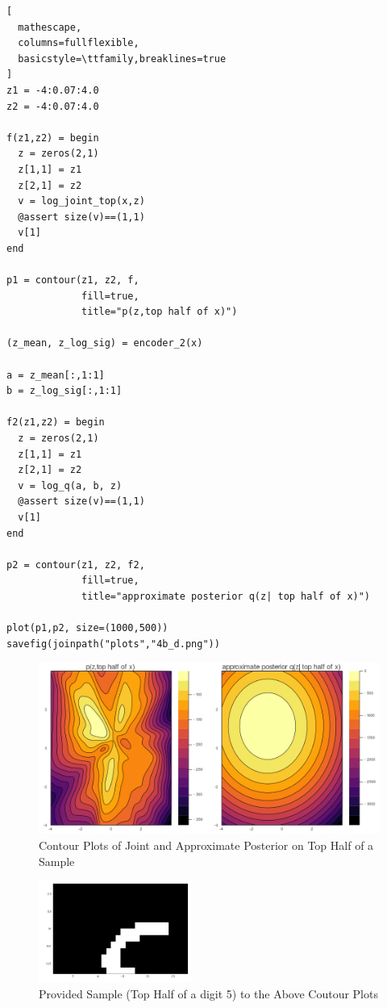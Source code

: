 \documentclass{article}
\begin{document}
\begin{enumerate}[label=(\alph*)]
\begin{lstlisting}[
  mathescape,
  columns=fullflexible,
  basicstyle=\ttfamily,breaklines=true
]
z1 = -4:0.07:4.0
z2 = -4:0.07:4.0

f(z1,z2) = begin
  z = zeros(2,1)
  z[1,1] = z1
  z[2,1] = z2
  v = log_joint_top(x,z)
  @assert size(v)==(1,1)
  v[1]
end

p1 = contour(z1, z2, f,
             fill=true,
             title="p(z,top half of x)")

(z_mean, z_log_sig) = encoder_2(x)

a = z_mean[:,1:1]
b = z_log_sig[:,1:1]

f2(z1,z2) = begin
  z = zeros(2,1)
  z[1,1] = z1
  z[2,1] = z2
  v = log_q(a, b, z)
  @assert size(v)==(1,1)
  v[1]
end

p2 = contour(z1, z2, f2,
             fill=true,
             title="approximate posterior q(z| top half of x)")

plot(p1,p2, size=(1000,500))
savefig(joinpath("plots","4b_d.png"))
\end{lstlisting}
\begin{figure}[h]
  \centering
  \includegraphics[width=15cm]{plots/4b_d.png}
  \caption{Contour Plots of Joint and Approximate Posterior on Top Half of a Sample}
\end{figure}

\begin{figure}[h]
  \centering
  \includegraphics[width=5cm]{plots/4b_d_sample.png}
  \caption{Provided Sample (Top Half of a digit 5) to the Above Coutour Plots}
\end{figure}

\pagebreak


\end{enumerate}
\end{document}
